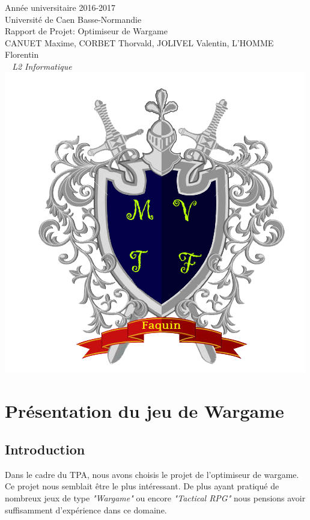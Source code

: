 \documentclass{article}
\begin{document}
\begin{titlepage}
	\begin{center}
		\Large{Année universitaire 2016-2017}\\
		\Large{Université de Caen Basse-Normandie}\\[1cm]		
		\huge Rapport de Projet: Optimiseur de Wargame\\[0.5cm]
		\vspace{1cm}
		CANUET Maxime, CORBET Thorvald, JOLIVEL Valentin, L'HOMME Florentin\\
		\normalsize{\textit{ ~ L2 Informatique}}\\
		\vspace{2cm}
		\includegraphics[scale=2.1]{../images/TRY1.png}
	\end{center}
\end{titlepage} 

\clearpage

\tableofcontents

\clearpage

\section{Présentation du jeu de Wargame}
 \subsection{Introduction}
 Dans le cadre du TPA, nous avons choisis le projet de l'optimiseur de wargame. Ce projet nous semblait être le plus intéressant. De plus ayant pratiqué de nombreux jeux de type \textit{"Wargame"} ou encore \textit{"Tactical RPG"} nous pensions avoir suffisamment d'expérience dans ce domaine.
\end{document}
